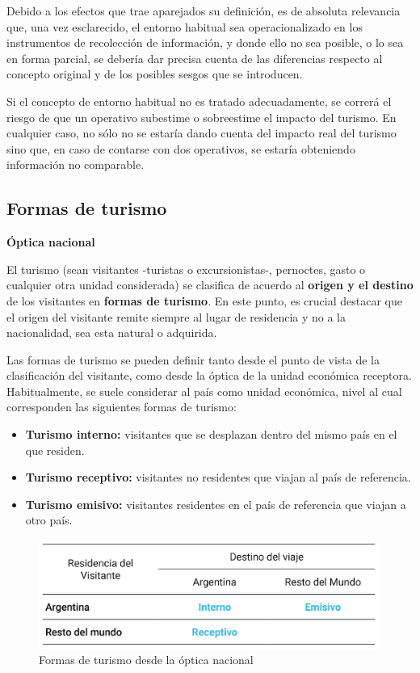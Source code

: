 \documentclass[
  openany]{book}
\begin{document}
Debido a los efectos que trae aparejados su definición, es de absoluta relevancia que, una vez esclarecido, el entorno habitual sea operacionalizado en los instrumentos de recolección de información, y donde ello no sea posible, o lo sea en forma parcial, se debería dar precisa cuenta de las diferencias respecto al concepto original y de los posibles sesgos que se introducen.

Si el concepto de entorno habitual no es tratado adecuadamente, se correrá el riesgo de que un operativo subestime o sobreestime el impacto del turismo. En cualquier caso, no sólo no se estaría dando cuenta del impacto real del turismo sino que, en caso de contarse con dos operativos, se estaría obteniendo información no comparable.

\hypertarget{formas-de-turismo}{%
\subsection{Formas de turismo}\label{formas-de-turismo}}

\textbf{Óptica nacional}

El turismo (sean visitantes -turistas o excursionistas-, pernoctes, gasto o cualquier otra unidad considerada) se clasifica de acuerdo al \textbf{origen y el destino} de los visitantes en \textbf{formas de turismo}. En este punto, es crucial destacar que el origen del visitante remite siempre al lugar de residencia y no a la nacionalidad, sea esta natural o adquirida.

Las formas de turismo se pueden definir tanto desde el punto de vista de la clasificación del visitante, como desde la óptica de la unidad económica receptora. Habitualmente, se suele considerar al país como unidad económica, nivel al cual corresponden las siguientes formas de turismo:

\begin{itemize}
\item
  \textbf{Turismo interno:} visitantes que se desplazan dentro del mismo país en el que residen.
\item
  \textbf{Turismo receptivo:} visitantes no residentes que viajan al país de referencia.
\item
  \textbf{Turismo emisivo:} visitantes residentes en el país de referencia que viajan a otro país.
\end{itemize}

\begin{figure}

{\centering \includegraphics[width=1\linewidth]{imagenes/figura1.3} 

}

\caption{Formas de turismo desde la óptica nacional}\label{fig:nacional}
\end{figure}
\end{document}
